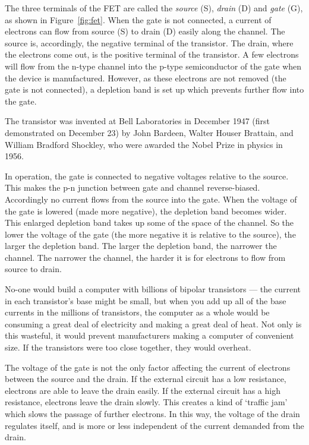 The three terminals of the FET are called the \textit{source} (S), \textit{drain} (D) and \textit{gate} (G), as shown in Figure~\ref{fig:fet}.  When the gate is not connected, a current of electrons can flow from source (S) to drain (D) easily along the channel.  The source is, accordingly, the negative terminal of the transistor.  The drain, where the electrons come out, is the positive terminal of the transistor.  A few electrons will flow from the n-type channel into the p-type semiconductor of the gate when the device is manufactured.  However, as these electrons are not removed (the gate is not connected), a depletion band is set up which prevents further flow into the gate.

\begin{IFact}{The transistor was invented at Bell Laboratories in December 1947 (first demonstrated on December 23) by John Bardeen, Walter Houser Brattain, and William Bradford Shockley, who were awarded the Nobel Prize in physics in 1956.}\end{IFact}
In operation, the gate is connected to negative voltages relative to the source.  This makes the p-n junction between gate and channel reverse-biased.  Accordingly no current flows from the source into the gate.  When the voltage of the gate is lowered (made more negative), the depletion band becomes wider.  This enlarged depletion band takes up some of the space of the channel.  So the lower the voltage of the gate (the more negative it is relative to the source), the larger the depletion band.  The larger the depletion band, the narrower the channel.  The narrower the channel, the harder it is for electrons to flow from source to drain.

\begin{IFact}{No-one would build a computer with billions of bipolar transistors --- the current in each transistor's base might be small, but when you add up all of the base currents in the millions of transistors, the computer as a whole would be consuming a great deal of electricity and making a great deal of heat.  Not only is this wasteful, it would prevent manufacturers making a computer of convenient size.  If the transistors were too close together, they would overheat.}\end{IFact}
The voltage of the gate is not the only factor affecting the current of electrons between the source and the drain.  If the external circuit has a low resistance, electrons are able to leave the drain easily.  If the external circuit has a high resistance, electrons leave the drain slowly.  This creates a kind of `traffic jam' which slows the passage of further electrons.  In this way, the voltage of the drain regulates itself, and is more or less independent of the current demanded from the drain.

